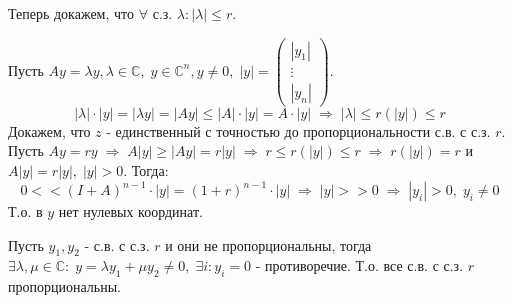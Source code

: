 \begin{Proof}
	Теперь докажем, что $\forall$ с.з. $\lambda: |\lambda| \le r$.

	Пусть $A y = \lambda y, \lambda \in \mathbb{C}, \; y \in\mathbb{C}^n, y \not =0, \; |y| = \begin{pmatrix}
		|y_1| \\ \vdots \\ |y_n|
	\end{pmatrix}$.
	$$|\lambda| \cdot |y| = |\lambda y| = |Ay| \le |A| \cdot |y| = A \cdot |y| \; \Rightarrow \; |\lambda| \le r(|y|) \le r$$
	Докажем, что $z$ - единственный с точностью до пропорциональности с.в. с с.з. $r$. Пусть $A y = r y \; \Rightarrow \; A |y| \ge |A y| = r |y| \; \Rightarrow \; r \le r(|y|) \le r \; \Rightarrow \; r(|y|) = r$ и $A |y| = r|y|, \; |y| > 0$. Тогда:
	$$0 << (I+A)^{n-1}\cdot |y| = (1+r)^{n-1} \cdot |y| \; \Rightarrow \; |y| >> 0 \; \Rightarrow \; |y_i| > 0, \; y_i \not = 0$$
	Т.о. в $y$ нет нулевых координат.

	Пусть $y_1, y_2$ - с.в. с с.з. $r$ и они не пропорциональны, тогда $\exists \lambda, \mu \in \mathbb{C}: \; y = \lambda y_1 + \mu y_2 \not = 0, \; \exists i: y_i = 0$ - противоречие. Т.о. все с.в. с с.з. $r$ пропорциональны.
\end{Proof}

